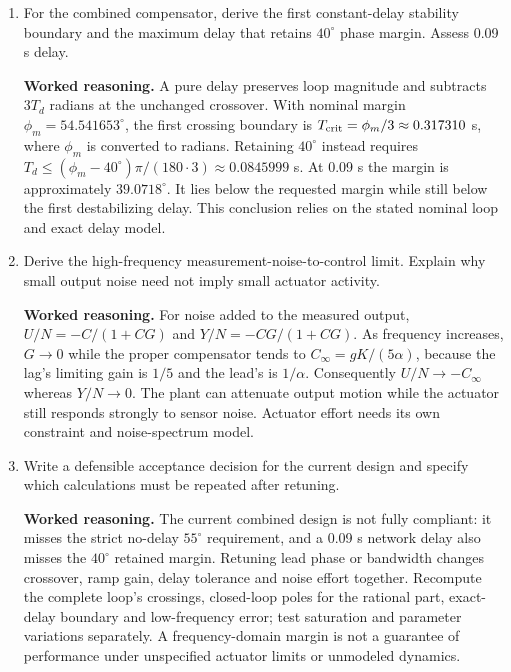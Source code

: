 \documentclass[10pt,a4paper]{article}
\newcommand{\answer}{\par\smallskip\textbf{Worked reasoning.} }
\begin{document}
\begin{enumerate}
\item For the combined compensator, derive the first constant-delay stability boundary and the maximum delay that retains $40^\circ$ phase margin. Assess 0.09 s delay.
\answer A pure delay preserves loop magnitude and subtracts $3T_d$ radians at the unchanged crossover. With nominal margin $\phi_m=54.541653^\circ$, the first crossing boundary is $T_{\rm crit}=\phi_m/3\approx0.317310$ s, where $\phi_m$ is converted to radians. Retaining $40^\circ$ instead requires $T_d\le(\phi_m-40^\circ)\pi/(180\cdot3)\approx0.0845999$ s. At 0.09 s the margin is approximately $39.0718^\circ$. It lies below the requested margin while still below the first destabilizing delay. This conclusion relies on the stated nominal loop and exact delay model.
\item Derive the high-frequency measurement-noise-to-control limit. Explain why small output noise need not imply small actuator activity.
\answer For noise added to the measured output, $U/N=-C/(1+CG)$ and $Y/N=-CG/(1+CG)$. As frequency increases, $G\to0$ while the proper compensator tends to $C_\infty=gK/(5\alpha)$, because the lag's limiting gain is $1/5$ and the lead's is $1/\alpha$. Consequently $U/N\to-C_\infty$ whereas $Y/N\to0$. The plant can attenuate output motion while the actuator still responds strongly to sensor noise. Actuator effort needs its own constraint and noise-spectrum model.
\item Write a defensible acceptance decision for the current design and specify which calculations must be repeated after retuning.
\answer The current combined design is not fully compliant: it misses the strict no-delay $55^\circ$ requirement, and a 0.09 s network delay also misses the $40^\circ$ retained margin. Retuning lead phase or bandwidth changes crossover, ramp gain, delay tolerance and noise effort together. Recompute the complete loop's crossings, closed-loop poles for the rational part, exact-delay boundary and low-frequency error; test saturation and parameter variations separately. A frequency-domain margin is not a guarantee of performance under unspecified actuator limits or unmodeled dynamics.
\end{enumerate}
\end{document}
